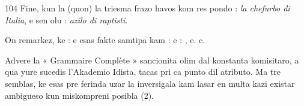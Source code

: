 \begin{VUpage}[108]{104}
Fine, kun la  (quon) la triesma frazo havos kom res\cc
pondo : \textit{la chefurbo di Italia}, e sen olu : \textit{azilo di raptisti}.

On remarkez, ke : \nl
e  esas fakte samtipa\nl
kam :  e : , e. c.

Advere la « Grammaire Complète » sancionita olim dal\nl
konstanta komisitaro, a qua yure sucedis l'Akademio Idista,\nl
tacas pri ca punto dil atributo. Ma tre semblas, ke esas pre\cc
ferinda uzar la  inversigala kam lasar en multa kazi existar\nl
ambigueso kun miskompreni posibla (2).
\end{VUpage}

